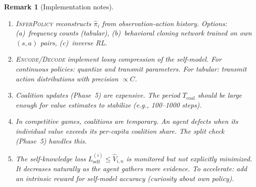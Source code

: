\documentclass[11pt]{article}
\newtheorem{remark}[theorem]{Remark}
\begin{document}
\begin{remark}[Implementation notes]
\begin{enumerate}
  \item \textsc{InferPolicy} reconstructs $\hat{\pi}_i$ from observation-action
    history. Options: (a)~frequency counts (tabular), (b)~behavioral cloning
    network trained on own $(s,a)$ pairs, (c)~inverse RL.
  \item \textsc{Encode}/\textsc{Decode} implement lossy compression of the
    self-model. For continuous policies: quantize and transmit parameters.
    For tabular: transmit action distributions with precision $\propto C$.
  \item Coalition updates (Phase~5) are expensive. The period $T_{\text{coal}}$
    should be large enough for value estimates to stabilize (e.g., 100--1000 steps).
  \item In competitive games, coalitions are temporary. An agent defects when
    its individual value exceeds its per-capita coalition share.
    The split check (Phase~5) handles this.
  \item The self-knowledge loss $L_{\text{self}}^{(i)} \leq \hat{V}_{i,n}$
    is monitored but not explicitly minimized. It decreases naturally as
    the agent gathers more evidence. To accelerate: add an intrinsic reward
    for self-model accuracy (curiosity about own policy).
\end{enumerate}
\end{remark}



\end{document}
